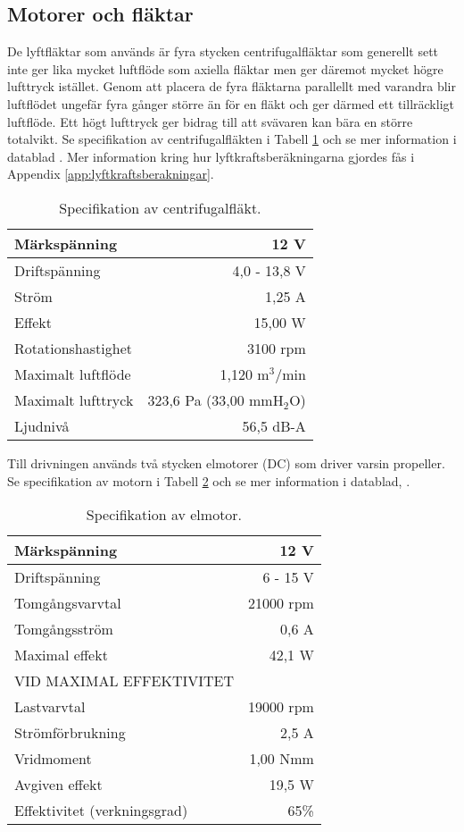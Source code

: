 \subsection{Motorer och fläktar}
De lyftfläktar som används är fyra stycken centrifugalfläktar som generellt sett
inte ger lika mycket luftflöde som axiella fläktar men ger däremot mycket högre
lufttryck istället. Genom att placera de fyra fläktarna parallellt med varandra
blir luftflödet ungefär fyra gånger större än för en fläkt och ger därmed ett
tillräckligt luftflöde. Ett högt lufttryck ger bidrag till att svävaren kan bära
en större totalvikt. Se specifikation av centrifugalfläkten i Tabell
\ref{tbl:fan_spec} och se mer information i datablad \cite{Delta_BFB1212VH-R00}
. Mer information kring hur lyftkraftsberäkningarna gjordes fås i Appendix
\ref{app:lyftkraftsberakningar}.

\begin{table}[htbp!]
\centering
\caption{Specifikation av centrifugalfläkt.}
\label{tbl:fan_spec}
\begin{tabular}{|l|r|}
\hline
Märkspänning & 12 V\\
\hline
Driftspänning & 4,0 - 13,8 V\\
\hline
Ström & 1,25 A\\
\hline
Effekt & 15,00 W\\
\hline
Rotationshastighet & 3100 rpm\\
\hline
Maximalt luftflöde & 1,120 m$^3$/min\\
\hline
Maximalt lufttryck & 323,6 Pa (33,00 mmH$_2$O)\\
\hline
Ljudnivå & 56,5 dB-A\\
\hline
\end{tabular}
\end{table}

Till drivningen används två stycken elmotorer (DC) som driver varsin propeller.
Se specifikation av motorn i Tabell \ref{tbl:motor_spec} och se mer information
i datablad, \cite{Motraxx_XFLY400-12}.

\begin{table}[htbp!]
\centering
\caption{Specifikation av elmotor.}
\label{tbl:motor_spec}
\begin{tabular}{|l|r|}
\hline
Märkspänning & 12 V\\
\hline
Driftspänning & 6 - 15 V\\
\hline
Tomgångsvarvtal & 21000 rpm\\
\hline
Tomgångsström & 0,6 A\\
\hline
Maximal effekt & 42,1 W\\
\hline
VID MAXIMAL EFFEKTIVITET &\\
\hline
Lastvarvtal & 19000 rpm\\
\hline
Strömförbrukning & 2,5 A\\
\hline
Vridmoment & 1,00 Nmm\\
\hline
Avgiven effekt & 19,5 W\\
\hline
Effektivitet (verkningsgrad) & 65\%\\
\hline
\end{tabular}	
\end{table}
